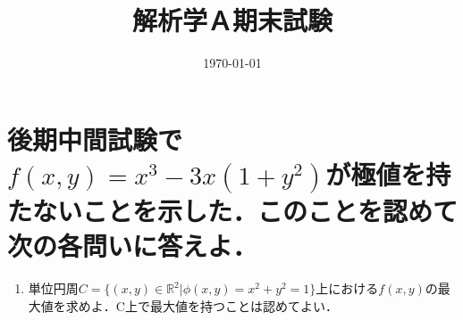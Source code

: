 \documentclass[a4paper,10pt]{jarticle}
\title{解析学Ａ期末試験}
\date{\today}
\begin{document}
\setlength{\parindent}{0pt}
\setlength{\columnseprule}{0.4pt}

\renewcommand{\thesection}{\fbox{\arabic{section}}}
\renewcommand{\labelenumi}{(\theenumi)}

\maketitle

\section{後期中間試験で$f(x,y)=x^3-3x(1+y^2)$が極値を持たないことを示した．このことを認めて次の各問いに答えよ．}
\begin{enumerate}
\item 単位円周$C=\{(x,y) \in \mathbb{R}^2 | \phi(x,y)=x^2+y^2=1\}$上における$f(x,y)$の最大値を求めよ．C上で最大値を持つことは認めてよい．



\end{enumerate}
\end{document}
